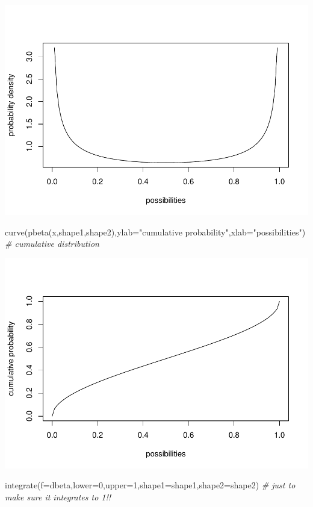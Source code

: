 \documentclass[
]{article}
\newenvironment{Shaded}{\begin{snugshade}}{\end{snugshade}}
\newcommand{\AttributeTok}[1]{\textcolor[rgb]{0.77,0.63,0.00}{#1}}
\newcommand{\CommentTok}[1]{\textcolor[rgb]{0.56,0.35,0.01}{\textit{#1}}}
\newcommand{\DecValTok}[1]{\textcolor[rgb]{0.00,0.00,0.81}{#1}}
\newcommand{\FunctionTok}[1]{\textcolor[rgb]{0.00,0.00,0.00}{#1}}
\newcommand{\NormalTok}[1]{#1}
\newcommand{\StringTok}[1]{\textcolor[rgb]{0.31,0.60,0.02}{#1}}
\begin{document}
\includegraphics{LECTURE2_files/figure-latex/unnamed-chunk-14-1.pdf}

\begin{Shaded}
\begin{Highlighting}[]
\FunctionTok{curve}\NormalTok{(}\FunctionTok{pbeta}\NormalTok{(x,shape1,shape2),}\AttributeTok{ylab=}\StringTok{"cumulative probability"}\NormalTok{,}\AttributeTok{xlab=}\StringTok{"possibilities"}\NormalTok{)   }\CommentTok{\# cumulative distribution}
\end{Highlighting}
\end{Shaded}

\includegraphics{LECTURE2_files/figure-latex/unnamed-chunk-14-2.pdf}

\begin{Shaded}
\begin{Highlighting}[]
\FunctionTok{integrate}\NormalTok{(}\AttributeTok{f=}\NormalTok{dbeta,}\AttributeTok{lower=}\DecValTok{0}\NormalTok{,}\AttributeTok{upper=}\DecValTok{1}\NormalTok{,}\AttributeTok{shape1=}\NormalTok{shape1,}\AttributeTok{shape2=}\NormalTok{shape2)    }\CommentTok{\# just to make sure it integrates to 1!!}
\end{Highlighting}
\end{Shaded}
\end{document}
